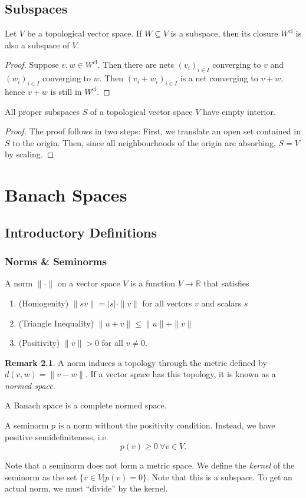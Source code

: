 \documentclass[twoside,symmetric, openany, 12pt]{./tuftebook}
\theoremstyle{definition}
\newtheorem{Remark}[Theorem]{Remark}
\theoremstyle{definition}
\theoremstyle{definition}
\newenvironment{parts}{\begin{enumerate}[label=(\alph*)]}{\end{enumerate}}
\newcommand{\R}{\mathbb{R}}
\begin{document}
	\section{Subspaces}
	\begin{Theorem}
		Let $V$ be a topological vector space. If $W\subseteq V$ is a subspace, then its closure $W^\text{cl}$ is also a subspace of $V$.
	\end{Theorem}
	\begin{proof}
Suppose $v,w\in W^\text{cl}$. Then there are nets $(v_i)_{i\in I}$ converging to $v$ and $(w_i)_{i\in I}$ converging to $w$. Then $(v_i+w_i)_{i\in I}$ is a net converging to $v+w$, hence $v+w$ is still in $W^\text{cl}$. 
	\end{proof}
\begin{Theorem}
	All proper subspaces $S$ of a topological vector space $V$ have empty interior.
\end{Theorem}
\begin{proof}
The proof follows in two steps: First, we translate an open set contained in $S$ to the origin. Then, since all neighbourhoods of the origin are absorbing, $S=V$ by scaling.
\end{proof}
	\chapter{Banach Spaces}
	\section{Introductory Definitions}
	\subsection{Norms \& Seminorms}
	\begin{Definition}[Norm]
		A norm $\|\cdot\|$ on a vector space $V$ is a function $V\to \R$ that satisfies
		\begin{parts}
			\item (Homogenity) $\|sv\|=|s|\cdot \|v\|$ for all vectors $v$ and scalars $s$
			\item (Triangle Inequality) $\|u+v\|\le \|u\| + \|v\|$
			\item (Positivity) $\|v\|>0$ for all $v\neq 0$.  
		\end{parts}
	\end{Definition}
	\begin{Remark}
		A norm induces a topology through the metric defined by $d(v, w)=\|v-w\|$. If a vector space has this topology, it is known as a \emph{normed space}.
	\end{Remark}
	\begin{Definition}
		A Banach space is a complete normed space.
\end{Definition}
	\begin{Definition}[Seminorm]
		A seminorm $p$ is a norm without the positivity condition. Instead, we have positive semidefiniteness, i.e.
		\[p(v)\ge 0~\forall v\in V.\]
	\end{Definition}
	Note that a seminorm does not form a metric space. We define the \emph{kernel} of the seminorm as the set $\{v\in V|p(v)=0\}$. Note that this is a subspace. To get an actual norm, we must ``divide'' by the kernel.
	
\end{document}
